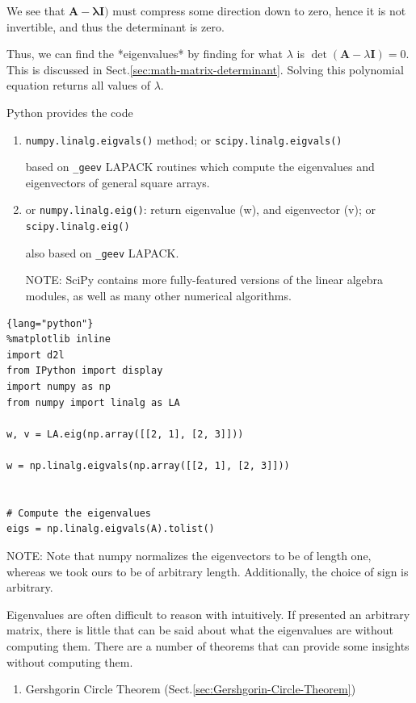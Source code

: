 We see that  $\mathbf{A- \lambda I)}$
must compress some direction down to zero,
hence it is not invertible, and thus the determinant is zero.

Thus, we can find the *eigenvalues* by finding for what $\lambda$ is
$\det(\mathbf{A}-\lambda \mathbf{I}) = 0$. This is discussed in
Sect.\ref{sec:math-matrix-determinant}.
Solving this polynomial equation returns all values of $\lambda$.


Python provides the code
\begin{enumerate}
  
  \item   \verb!numpy.linalg.eigvals()! method; or \verb!scipy.linalg.eigvals()!
  
  based on \verb!_geev! LAPACK routines which compute the eigenvalues and eigenvectors of general square arrays.
  
  \item or \verb!numpy.linalg.eig()!: return eigenvalue (w), and eigenvector (v); 
  or \verb!scipy.linalg.eig()!
  
  also based on \verb!_geev! LAPACK.
  
  NOTE: SciPy contains more fully-featured versions of the linear algebra
  modules, as well as many other numerical algorithms.
  
\end{enumerate}


\begin{lstlisting}{lang="python"}
%matplotlib inline
import d2l
from IPython import display
import numpy as np
from numpy import linalg as LA

w, v = LA.eig(np.array([[2, 1], [2, 3]]))

w = np.linalg.eigvals(np.array([[2, 1], [2, 3]]))


# Compute the eigenvalues
eigs = np.linalg.eigvals(A).tolist()
\end{lstlisting}

NOTE: Note that numpy normalizes the eigenvectors to be of length one,
whereas we took ours to be of arbitrary length.
Additionally, the choice of sign is arbitrary.

Eigenvalues are often difficult to reason with intuitively.
If presented an arbitrary matrix, there is little that can be said about what
the eigenvalues are without computing them. There are a number of theorems that
can provide some insights without computing them.
\begin{enumerate}
  \item Gershgorin Circle Theorem (Sect.\ref{sec:Gershgorin-Circle-Theorem})
\end{enumerate}

